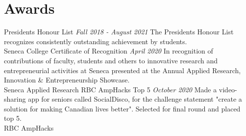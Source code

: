 \documentclass[letterpaper]{moderncv}
\begin{document}
\section{Awards}
\cventry
{}
{President\textquotesingle{}s Honour List}
{}
{\textit{Fall 2018 - August 2021}}
{}
{The President\textquotesingle{}s Honour List recognizes consistently outstanding achievement by students.\\Seneca College}
\vspace{1mm}
\cventry
{}
{Certificate of Recognition}
{}
{\textit{April 2020}}
{}
{In recognition of contributions of faculty, students and others to innovative research and entrepreneurial activities at Seneca presented at the Annual Applied Research, Innovation \& Entrepreneurship Showcase.\\Seneca Applied Research}
\vspace{1mm}
\cventry
{}
{RBC AmpHacks Top 5}
{}
{\textit{October 2020}}
{}
{Made a video-sharing app for seniors called SocialDisco, for the challenge statement "create a solution for making Canadian lives better". Selected for final round and placed top 5.\\RBC AmpHacks}
\vspace{1mm}
\ 
\end{document}
